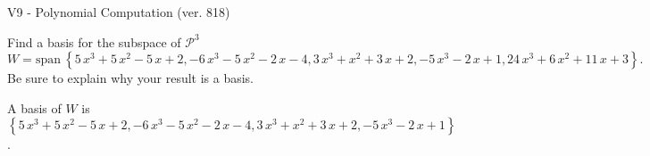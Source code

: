 \begin{exercise}
  \begin{exerciseTitle}V9 - Polynomial Computation (ver. 818)\end{exerciseTitle}
  \begin{exerciseStatement}
    Find a basis for the subspace of \(\mathcal{P}^3\) 
\[W=\mathrm{span}\ \left\{5 \, x^{3} + 5 \, x^{2} - 5 \, x + 2 , -6 \, x^{3} - 5 \, x^{2} - 2 \, x - 4 , 3 \, x^{3} + x^{2} + 3 \, x + 2 , -5 \, x^{3} - 2 \, x + 1 , 24 \, x^{3} + 6 \, x^{2} + 11 \, x + 3\right\}.\]
 Be sure to explain why your result is a basis.


  \end{exerciseStatement}
  \begin{exerciseAnswer}
   A basis of \(W\) is  \(\left\{5 \, x^{3} + 5 \, x^{2} - 5 \, x + 2 , -6 \, x^{3} - 5 \, x^{2} - 2 \, x - 4 , 3 \, x^{3} + x^{2} + 3 \, x + 2 , -5 \, x^{3} - 2 \, x + 1\right\}\).
  


  \end{exerciseAnswer}
\end{exercise}
